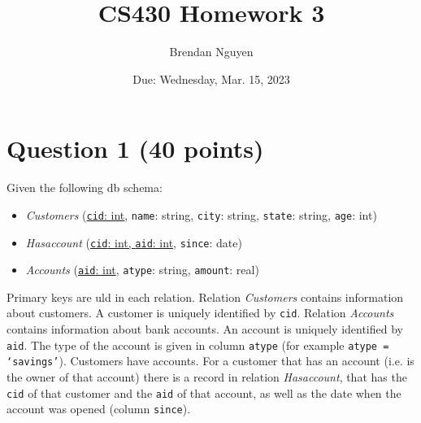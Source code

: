 \documentclass[letterpaper, 11pt]{article}
\title{CS430 Homework 3}
\author{Brendan Nguyen}
\date{Due: Wednesday, Mar. 15, 2023}
\begin{document}
\maketitle

\section*{Question 1 (40 points)}

Given the following db schema:
\begin{itemize}
    \item \textit{Customers} (\ul{\texttt{cid}: int}, \texttt{name}: string, \texttt{city}: string, \texttt{state}: string, \texttt{age}: int)
    \item \textit{Has\textunderscore account} (\ul{\texttt{cid}: int, \texttt{aid}: int}, \texttt{since}: date)
    \item \textit{Accounts} (\ul{\texttt{aid}: int}, \texttt{atype}: string, \texttt{amount}: real)
\end{itemize}

Primary keys are uld in each relation. Relation \textit{Customers} contains information about customers. A customer is uniquely identified by \texttt{cid}. Relation \textit{Accounts} contains information about bank accounts. An account is uniquely identified by \texttt{aid}. The type of the account is given in column \texttt{atype} (for example  \texttt{atype = `savings'}).  Customers have accounts. For a customer that has an account (i.e. is the owner of that account) there is a record in relation \textit{Has\textunderscore account}, that has the \texttt{cid} of that customer and the \texttt{aid} of that account, as well as the date when the account was opened (column \texttt{since}).
\end{document}
